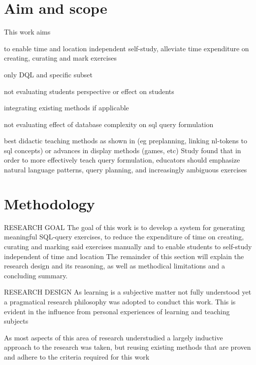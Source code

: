 \section{Aim and scope}
\label{sec:intro:scope}

This work aims 

to enable time and location independent self-study, 
alleviate time expenditure on creating, curating and mark exercises

only DQL and specific subset

not evaluating students perspective or effect on students

integrating existing methods if applicable

not evaluating effect of database complexity on sql query formulation \cite{Taipalus2020TheEO}

best didactic teaching methods as shown in (eg preplanning, linking nl-tokens to sql concepts) or advances in display methods (games, etc) \cite{Taipalus2020SQLE, Ishaq2022AdvancesID}
Study found that in order to more effectively teach query formulation, educators should emphasize natural language patterns, query planning, and increasingly ambiguous exercises \cite{Taipalus2020ExplainingCB}


\section{Methodology}
\label{sec:intro:methodology}

RESEARCH GOAL
The goal of this work is to develop a system for generating meaningful SQL-query exercises, to reduce the expenditure of time on creating, curating and marking said exercises manually and to enable students to self-study independent of time and location
The remainder of this section will explain the research design and its reasoning, as well as methodical limitations and a concluding summary.

RESEARCH DESIGN
    As learning is a subjective matter not fully understood yet a pragmatical research philosophy was adopted to conduct this work. This is evident in the influence from personal experiences of learning and teaching subjects
    
    As most aspects of this area of research understudied a largely inductive approach to the research was taken, but reusing existing methods that are proven and adhere to the criteria required for this work
    

